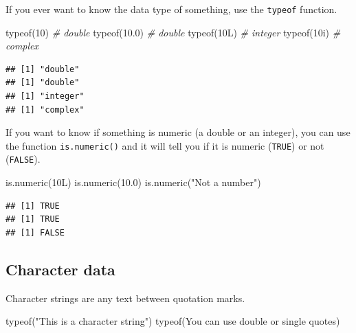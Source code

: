 \documentclass[
  oneside]{book}
\newenvironment{Shaded}{\begin{snugshade}}{\end{snugshade}}
\newcommand{\CommentTok}[1]{\textcolor[rgb]{0.56,0.35,0.01}{\textit{#1}}}
\newcommand{\DecValTok}[1]{\textcolor[rgb]{0.00,0.00,0.81}{#1}}
\newcommand{\FloatTok}[1]{\textcolor[rgb]{0.00,0.00,0.81}{#1}}
\newcommand{\FunctionTok}[1]{\textcolor[rgb]{0.00,0.00,0.00}{#1}}
\newcommand{\NormalTok}[1]{#1}
\newcommand{\StringTok}[1]{\textcolor[rgb]{0.31,0.60,0.02}{#1}}
\begin{document}
If you ever want to know the data type of something, use the \texttt{typeof} function.

\begin{Shaded}
\begin{Highlighting}[]
\FunctionTok{typeof}\NormalTok{(}\DecValTok{10}\NormalTok{)   }\CommentTok{\# double}
\FunctionTok{typeof}\NormalTok{(}\FloatTok{10.0}\NormalTok{) }\CommentTok{\# double}
\FunctionTok{typeof}\NormalTok{(10L)  }\CommentTok{\# integer}
\FunctionTok{typeof}\NormalTok{(10i)  }\CommentTok{\# complex}
\end{Highlighting}
\end{Shaded}

\begin{verbatim}
## [1] "double"
## [1] "double"
## [1] "integer"
## [1] "complex"
\end{verbatim}

If you want to know if something is numeric (a double or an integer), you can use the function \texttt{is.numeric()} and it will tell you if it is numeric (\texttt{TRUE}) or not (\texttt{FALSE}).

\begin{Shaded}
\begin{Highlighting}[]
\FunctionTok{is.numeric}\NormalTok{(10L)}
\FunctionTok{is.numeric}\NormalTok{(}\FloatTok{10.0}\NormalTok{)}
\FunctionTok{is.numeric}\NormalTok{(}\StringTok{"Not a number"}\NormalTok{)}
\end{Highlighting}
\end{Shaded}

\begin{verbatim}
## [1] TRUE
## [1] TRUE
## [1] FALSE
\end{verbatim}

\hypertarget{character-data}{%
\subsection{Character data}\label{character-data}}

Character strings are any text between quotation marks.

\begin{Shaded}
\begin{Highlighting}[]
\FunctionTok{typeof}\NormalTok{(}\StringTok{"This is a character string"}\NormalTok{)}
\FunctionTok{typeof}\NormalTok{(}\StringTok{\textquotesingle{}You can use double or single quotes\textquotesingle{}}\NormalTok{)}
\end{Highlighting}
\end{Shaded}
\end{document}
